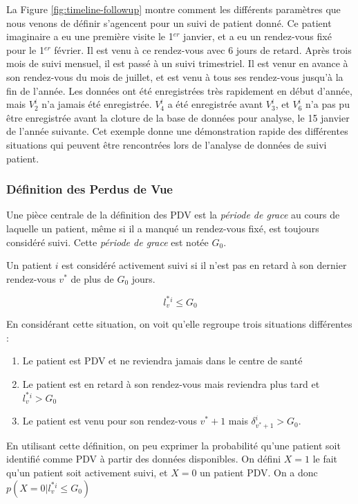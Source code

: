 \documentclass[paper=a4, fontsize=11pt]{scrartcl}
\numberwithin{equation}{section}		%
\numberwithin{figure}{section}			%
\numberwithin{table}{section}				%
\begin{document}
La Figure \ref{fig:timeline-followup} montre comment les différents paramètres que nous venons de définir s'agencent pour un suivi de patient donné. Ce patient imaginaire a eu une première visite le 1$^{er}$ janvier, et a eu un rendez-vous fixé pour le 1$^{er}$ février. Il est venu à ce rendez-vous avec 6 jours de retard. Après trois mois de suivi mensuel, il est passé à un suivi trimestriel. Il est venur en avance à son rendez-vous du mois de juillet, et est venu à tous ses rendez-vous jusqu'à la fin de l'année. Les données ont été enregistrées très rapidement en début d'année, mais $V_2^i$ n'a jamais été enregistrée. $V_4^i$ a été enregistrée avant $V_3^i$, et $V_6^i$ n'a pas pu être enregistrée avant la cloture de la base de données pour analyse, le 15 janvier de l'année suivante. Cet exemple donne une démonstration rapide des différentes situations qui peuvent être rencontrées lors de l'analyse de données de suivi patient.

\subsubsection{Définition des Perdus de Vue}

Une pièce centrale de la définition des PDV est la \textit{période de grace} au cours de laquelle un patient, même si il a manqué un rendez-vous fixé, est toujours considéré suivi. Cette \textit{période de grace} est notée $G_0$.

Un patient $i$ est considéré activement suivi si il n'est pas en retard à son dernier rendez-vous $v^*$ de plus de  $G_0$  jours.

$$l_v^{*}^i \leq  G_0$$

En considérant cette situation, on voit qu'elle regroupe trois situations différentes :
\begin{enumerate}
\item Le patient est PDV et ne reviendra jamais dans le centre de santé
\item Le patient est en retard à son rendez-vous mais reviendra plus tard et $l_v^{*}^i > G_0$
\item Le patient est venu pour son rendez-vous $v^{*} + 1$ mais $\delta_{v^*+1}^i > G_0$.
\end{enumerate}

En utilisant cette définition, on peu exprimer la probabilité qu'une patient soit identifié comme PDV à partir des données disponibles. On défini  $X = 1$ le fait qu'un patient soit activement suivi, et  $X = 0$ un patient PDV. On a donc $p(X = 0 | l_v^{*}^i \leq  G_0)$
\end{document}

